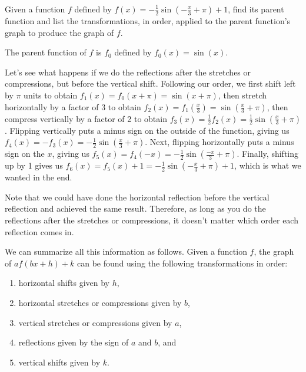 \documentclass[handout, noauthor, nooutcomes]{ximera}
\begin{document}
\begin{example}
Given a function $f$ defined by $f(x) = -\frac{1}{2}\sin\left(-\frac{x}{3} + \pi\right) + 1$, find its parent function and list the transformations, in order, applied to the parent function's graph to produce the graph of $f$. 
\begin{explanation}
The parent function of $f$ is $f_0$ defined by $f_0(x) = \sin(x)$. 

Let's see what happens if we do the reflections after the stretches or compressions, but before the vertical shift. Following our order, we first shift left by $\pi$ units to obtain $f_1(x) = f_0(x + \pi) = \sin(x + \pi)$, then stretch horizontally by a factor of 3 to obtain $f_2(x) = f_1\left(\frac{x}{3}\right) = \sin\left(\frac{x}{3} + \pi \right)$, then compress vertically by a factor of 2 to obtain $f_3(x) = \frac{1}{2}f_2(x)= \frac{1}{2}\sin\left(\frac{x}{3} + \pi \right)$. Flipping vertically puts a minus sign on the outside of the function, giving us $f_4(x) = -f_3(x) = - \frac{1}{2}\sin\left(\frac{x}{3} + \pi \right)$. Next, flipping horizontally puts a minus sign on the $x$, giving us $f_5(x) = f_4(-x) = - \frac{1}{2}\sin\left(\frac{-x}{3} + \pi \right)$. Finally, shifting up by 1 gives us $f_6(x) = f_5(x) + 1 = - \frac{1}{2}\sin\left(-\frac{x}{3} + \pi \right) + 1$, which is what we wanted in the end.

Note that we could have done the horizontal reflection before the vertical reflection and achieved the same result. Therefore, as long as you do the reflections after the stretches or compressions, it doesn't matter which order each reflection comes in. 
\end{explanation}
\end{example}

We can summarize all this information as follows. Given a function $f$, the graph of $af(bx + h) + k$ can be found using the following transformations in order:
\begin{enumerate}
\item horizontal shifts given by $h$,
\item horizontal stretches or compressions given by $b$,
\item vertical stretches or compressions given by $a$,
\item reflections given by the sign of $a$ and $b$, and
\item vertical shifts given by $k$.
\end{enumerate}
\end{document}
